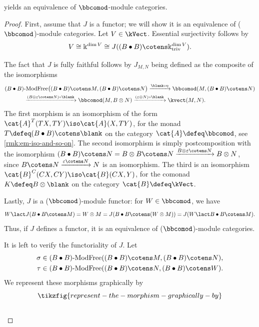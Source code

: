\begin{lemma}
   yields an equivalence of \(\bbcomod\)\hyp{}module categories.
\end{lemma}
\begin{proof}
  First, assume that \(J\) is a functor;
  we will show it is an equivalence of (\(\bbcomod\))\hyp{}module categories.
  Let \(V \in \kVect\).
  Essential surjectivity follows by
  \[
    V \cong \Bbbk^{\dim{V}} \cong J((B\bullet B)\cotens \Bbbk_{\mathrm{triv}}^{\dim{V}}).
  \]

  The fact that \(J\) is fully faithful follows by
  \(J_{M,N}\) being defined as the composite of the isomorphisms
  \begin{align*}
    (B \bullet B)&\textnormal{-ModFree}\big((B\bullet B)\cotens M,  (B\bullet B)\cotens N\big)
             \xrightarrow{\blank \circ \eta} \bbcomod(M,  (B\bullet B)\cotens N) \\
           & \xrightarrow{(B \otimes \varepsilon \cotens N) \circ \blank} \bbcomod(M,  B\otimes N)
             \xrightarrow{(\varepsilon \otimes N) \circ \blank} \kvect(M,N).
  \end{align*}
  The first morphism is an isomorphism of the form \(\cat{A}^T(TX, TY) \iso \cat{A}(X,TY)\),
  for the monad \(T \defeq (B \bullet B) \cotens \blank\) on the category \(\cat{A} \defeq \bbcomod\),
  see \cref{rmk:em-iso-and-so-on}.
  The second isomorphism is simply postcomposition with the isomorphism \((B \bullet B) \cotens N = B \otimes  B \cotens N \xrightarrow{B \otimes \varepsilon \cotens N} B \otimes N\),
  since \(B \cotens N \xrightarrow{\varepsilon \cotens N} N\) is an isomorphism.
  The third is an isomorphism \(\cat{B}^C(CX,CY) \iso \cat{B}(CX, Y)\),
  for the comonad \(K \defeq B \otimes \blank\) on the category \(\cat{B} \defeq \kVect\).

  Lastly, \(J\) is a (\(\bbcomod\))\hyp{}module functor:
  for \(W \in \bbcomod\), we have
  \[
    W \lact J(B\bullet B \cotens M) = W \otimes M = J(B\bullet B \cotens (W \otimes M)) = J(W \lact B \bullet B \cotens M).
  \]
  Thus, if \(J\) defines a functor, it is an equivalence of (\(\bbcomod\))\hyp{}module categories.

  It is left to verify the functoriality of \(J\).
  Let
  \begin{align*}
    \sigma &\in (B \bullet B)\text{-ModFree}((B \bullet B) \cotens M, (B \bullet B) \cotens N),\\
    \tau &\in (B \bullet B)\text{-ModFree}((B \bullet B) \cotens N, (B \bullet B) \cotens W).
  \end{align*}
  We represent these morphisms graphically by
  \[
    \tikzfig{represent-the-morphism-graphically-by}
  \]\\[-0.9em]


\end{proof}
